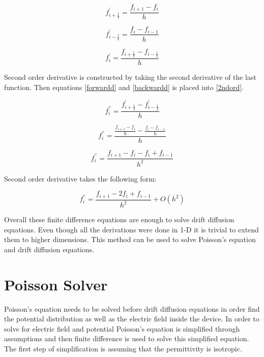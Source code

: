 \begin{doublespace}
\begin{equation}
f_{i+\frac{1}{2}}^{'}=\frac{f_{i+1}-f_{i}}{h}
\label{forwardd}
\end{equation}

\begin{equation}
f_{i-\frac{1}{2}}^{'}=\frac{f_{i}-f_{i-1}}{h}
\label{backwardd}
\end{equation}

\begin{equation}
f^{'}_{i}=\frac{f_{i+\frac{1}{2}}-f_{i-\frac{1}{2}}}{h}
\label{2ndord}
\end{equation}

Second order derivative is constructed by taking the second derivative of the last function. Then equations \ref{forwardd} and \ref{backwardd} is placed into \ref{2ndord}.

\begin{equation}\nonumber
f^{''}_{i}=\frac{f_{i+\frac{1}{2}}^{'}-f_{i-\frac{1}{2}}^{'}}{h}
\end{equation}

\begin{equation}\nonumber
f^{''}_{i}=\frac{\frac{f_{i+1}-f_{i}}{h}-\frac{f_{i}-f_{i-1}}{h}}{h}
\end{equation}

\begin{equation}\nonumber
f^{''}_{i}=\frac{f_{i+1}-f_{i}-f_{i}+f_{i-1}}{h^2}
\end{equation}

Second order derivative takes the following form:

\begin{equation}
f^{''}_{i}=\frac{f_{i+1}-2f_{i}+f_{i-1}}{h^2}+O(h^2)
\label{fdc2}
\end{equation}

Overall these finite difference equations are enough to solve drift diffusion equations. Even though all the derivations were done in 1-D it is trivial to extend them to higher dimensions. This method can be used to solve Poisson's equation and drift diffusion equations.

\clearpage

\section{Poisson Solver}

Poisson's equation needs to be solved before drift diffusion equations in order find the potential distribution as well as the electric field inside the device. In order to solve for electric field and potential Poisson's equation is simplified through assumptions and then finite difference is used to solve this simplified equation. The first step of simplification is assuming that the permittivity is isotropic.
 

\end{doublespace}

